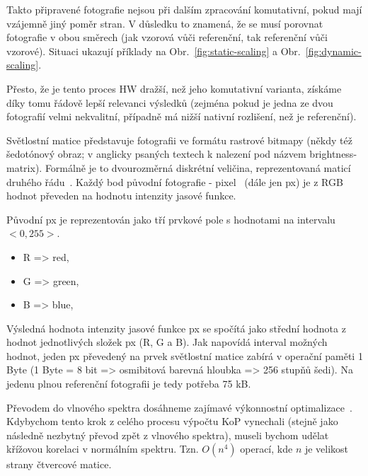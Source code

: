 Takto připravené fotografie nejsou při dalším zpracování komutativní, pokud mají vzájemně jiný poměr stran. V důsledku to znamená, že se musí porovnat fotografie v obou směrech (jak vzorová vůči referenční, tak referenční vůči vzorové). Situaci ukazují příklady na Obr.~\ref{fig:static-scaling} a Obr.~\ref{fig:dynamic-scaling}.



Přesto, že je tento proces HW dražší, než jeho komutativní varianta, získáme díky tomu řádově lepší relevanci výsledků (zejména pokud je jedna ze dvou fotografií velmi nekvalitní, případně má nižší nativní rozlišení, než je referenční).

Světlostní matice představuje fotografii ve formátu rastrové bitmapy (někdy též šedotónový obraz; v anglicky psaných textech k nalezení pod názvem brightness-matrix). Formálně je to dvourozměrná diskrétní veličina, reprezentovaná maticí druhého řádu~\cite{brightness-matrix}. Každý bod původní fotografie - pixel~\cite{pixel} (dále jen px) je z RGB~\cite{rgb} hodnot převeden na hodnotu intenzity jasové funkce.

Původní px je reprezentován jako tří prvkové pole s hodnotami na intervalu $ <0,255> $.
\begin{itemize}
	\setlength{\parskip}{0pt}
	\setlength{\itemsep}{0pt}
	\item R => red,
	\item G => green,
	\item B => blue,
\end{itemize}

Výsledná hodnota intenzity jasové funkce px se spočítá jako střední hodnota z hodnot jednotlivých složek px (R, G a B). Jak napovídá interval možných hodnot, jeden px převedený na prvek světlostní matice zabírá v operační paměti 1 Byte (1 Byte = 8 bit => osmibitová barevná hloubka => 256 stupňů šedi). Na jedenu plnou referenční fotografii je tedy potřeba 75 kB.

Převodem do vlnového spektra dosáhneme zajímavé výkonnostní optimalizace~\cite{FFT}. Kdybychom tento krok z celého procesu výpočtu KoP vynechali (stejně jako následně nezbytný převod zpět z vlnového spektra), museli bychom udělat křížovou korelaci v normálním spektru. Tzn. $ O(n^4) $ operací, kde $ n $ je velikost strany čtvercové matice.

